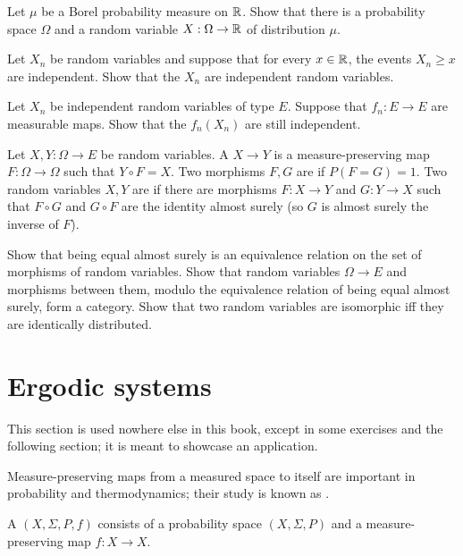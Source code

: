 \begin{exercise}\label{Skohorod representation}
Let $\mu$ be a Borel probability measure on $\mathbb{R}$.
Show that there is a probability space $\Omega$ and a random variable $X: \Omega \to \mathbb{R}$ of distribution $\mu$.
\end{exercise}

\begin{exercise}
Let $X_{n}$ be random variables and suppose that for every $x \in \mathbb{R}$, the events $X_{n} \geq x$ are independent.
Show that the $X_{n}$ are independent random variables.
\end{exercise}

\begin{exercise}
Let $X_{n}$ be independent random variables of type $E$.
Suppose that $f_{n}: E \to E$ are measurable maps.
Show that the $f_{n}(X_{n})$ are still independent.
\end{exercise}

\begin{exercise}
Let $X, Y: \Omega \to E$ be random variables.
A  $X \to Y$ is a measure-preserving map $F: \Omega \to \Omega$ such that $Y \circ F = X$.
Two morphisms $F,G$ are  if $P(F = G) = 1$.
Two random variables $X,Y$ are  if there are morphisms $F: X \to Y$ and $G: Y \to X$ such that $F \circ G$ and $G \circ F$ are the identity almost surely (so $G$ is almost surely the inverse of $F$).

Show that being equal almost surely is an equivalence relation on the set of morphisms of random variables.
Show that random variables $\Omega \to E$ and morphisms between them, modulo the equivalence relation of being equal almost surely, form a category.
Show that two random variables are isomorphic iff they are identically distributed.
\end{exercise}

\section{Ergodic systems}
This section is used nowhere else in this book, except in some exercises and the following section; it is meant to showcase an application.

Measure-preserving maps from a measured space to itself are important in probability and thermodynamics; their study is known as .

\begin{definition}
A  $(X, \Sigma, P, f)$ consists of a probability space $(X, \Sigma, P)$ and a measure-preserving map $f: X \to X$.
\end{definition}

